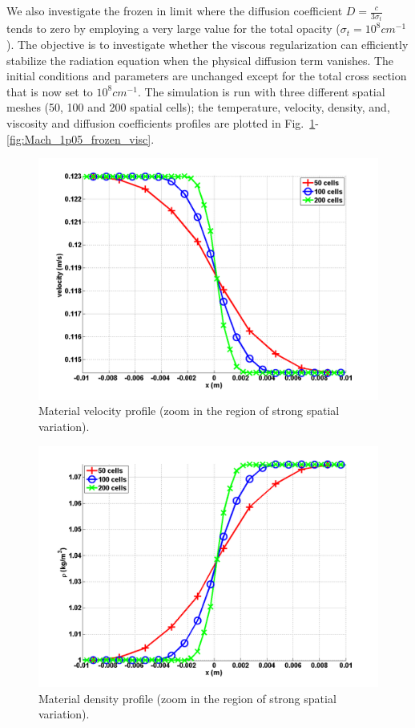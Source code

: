 \documentclass[review]{elsarticle}
\newcommand{\fig}[1]{Fig.~\ref{#1}}                      %
\begin{document}
We also investigate the frozen in limit where the diffusion coefficient $D = \frac{c}{3\sigma_t}$ tends to zero by employing a very large value for the total opacity ($\sigma_t = 10^8 cm^{-1}$). The objective is to investigate whether the viscous regularization can efficiently stabilize the radiation equation when the physical diffusion term vanishes. The initial conditions and parameters are unchanged except for the total cross section that is now set to $10^8 cm^{-1}$. The simulation is run with three different spatial meshes (50, 100 and 200 spatial cells); the temperature, velocity, density, and, viscosity and diffusion coefficients profiles are plotted in \fig{fig:Mach_1p05_frozen_density}-\ref{fig:Mach_1p05_frozen_visc}.
%
\begin{figure}[H]
        \centering
        \includegraphics[width=\textwidth]{Mach_1p05_zoom_in_velocity.png}
        \caption{Material velocity profile (zoom in the region of strong spatial variation).}
        \label{fig:Mach_1p05_frozen_density}
\end{figure}%
\begin{figure}[H]
            \centering
            \includegraphics[width=\textwidth]{Mach_1p05_zoom_in_density.png}
            \caption{Material density profile (zoom in the region of strong spatial variation).}
            \label{fig:Mach_1p05_frozen_velocity}
\end{figure}
\end{document}
